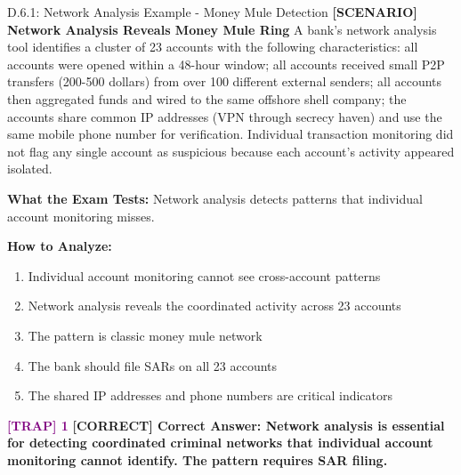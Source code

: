 \documentclass[11pt,a4paper]{beamer}
\newcommand{\trap}[1]{\textcolor{purple}{\textbf{[TRAP] 1}}}
\newcommand{\correct}[1]{\textcolor{green!50!black}{\textbf{[CORRECT] #1}}}
\newcommand{\scenario}[1]{\textcolor{blue!70!black}{\textbf{[SCENARIO] #1}}}
\begin{document}
\begin{frame}{D.6.1: Network Analysis Example - Money Mule Detection}
	\scenario{Network Analysis Reveals Money Mule Ring}
	A bank's network analysis tool identifies a cluster of 23 accounts with the following characteristics: all accounts were opened within a 48-hour window; all accounts received small P2P transfers (200-500 dollars) from over 100 different external senders; all accounts then aggregated funds and wired to the same offshore shell company; the accounts share common IP addresses (VPN through secrecy haven) and use the same mobile phone number for verification. Individual transaction monitoring did not flag any single account as suspicious because each account's activity appeared isolated.
	
	\vspace{0.1cm}
	\textbf{What the Exam Tests:} Network analysis detects patterns that individual account monitoring misses.
	
	\vspace{0.1cm}
	\textbf{How to Analyze:}
	\begin{enumerate}
		\item Individual account monitoring cannot see cross-account patterns
		\item Network analysis reveals the coordinated activity across 23 accounts
		\item The pattern is classic money mule network
		\item The bank should file SARs on all 23 accounts
		\item The shared IP addresses and phone numbers are critical indicators
	\end{enumerate}
	
	\trap{Common Distractor: "Individual account monitoring is sufficient; network analysis is optional."}
	\correct{Correct Answer: Network analysis is essential for detecting coordinated criminal networks that individual account monitoring cannot identify. The pattern requires SAR filing.}
\end{frame}

\end{document}
